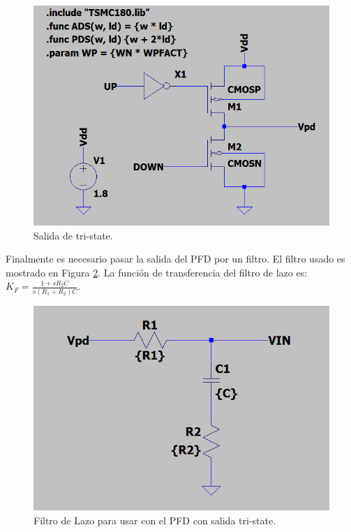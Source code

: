 \documentclass[a4paper]{article}
\begin{document}
\begin{figure}[!htb]
\centering
\includegraphics[scale=0.4]{./img/pfd_tri_state}
\caption{Salida de tri-state.}
\label{fig:pfd_tri_state}
\end{figure}

Finalmente es necesario pasar la salida del PFD por un filtro. El filtro usado es mostrado en Figura \ref{fig:pfd_loop_filter_sch}. La función de transferencia del filtro de lazo es: $K_F = \frac{1 + sR_2 C}{s(R_1 + R_2)C}$.

\begin{figure}[!htb]
\centering
\includegraphics[scale=0.4]{./img/pfd_loop_filter_sch}
\caption{Filtro de Lazo para usar con el PFD con salida tri-state.}
\label{fig:pfd_loop_filter_sch}
\end{figure}
\end{document}
